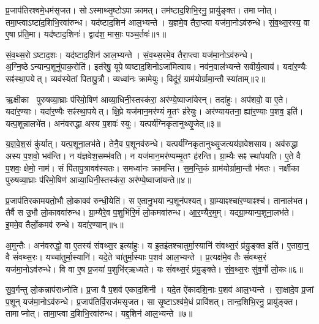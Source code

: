 प्र॒जाप॑तिरश्वमे॒धम॑सृजत।
सोऽस्माथ्सृ॒ष्टो\-ऽपाक्रामत्।
तम॑ष्टाद॒शिभि॒रनु॒ प्रायु॑ङ्क्त।
तमाप्नोत्।
तमा॒प्त्वा\-ऽष्टा॑द॒शिभि॒रवा॑रुन्ध।
यद॑ष्टाद॒शिन॑ आल॒भ्यन्ते।
य॒ज्ञमे॒व तैरा॒प्त्वा यज॑मा॒नो\-ऽव॑रुन्धे।
सं॒व॒थ्स॒रस्य॒ वा ए॒षा प्र॑ति॒मा।
यद॑ष्टाद॒शिनः॑।
द्वाद॑श॒ मासाः॒ पञ्च॒र्तवः॑॥१॥

सं॒व॒थ्स॒रो\-ऽष्टाद॒शः।
यद॑ष्टाद॒शिन॑ आल॒भ्यन्ते।
सं॒व॒थ्स॒रमे॒व तैरा॒प्त्वा यज॑मा॒नो\-ऽव॑रुन्धे।
अ॒ग्नि॒ष्ठे\-ऽन्यान्प॒शूनु॑पाक॒रोति॑।
इत॑रेषु॒ यूपेष्वष्टाद॒शिनो\-ऽजा॑मित्वाय।
नव॑न॒वाल॑भ्यन्ते सवीर्य॒त्वाय॑।
यदा॑र॒ण्यैः सꣴ॑स्था॒पयेत्।
व्यव॑स्येतां पितापु॒त्रौ।
व्यध्वा॑नः क्रामेयुः।
विदू॑रं॒ ग्राम॑योर्ग्रामा॒न्तौ स्या॑ताम्॥२॥

ऋ॒क्षीका पुरुषव्या॒घ्राः प॑रिमो॒षिण॑ आव्या॒धिनी॒स्तस्क॑रा॒ अर॑ण्ये॒ष्वाजा॑येरन्।
तदा॑हुः।
अप॑शवो॒ वा ए॒ते।
यदा॑र॒ण्याः।
यदा॑र॒ण्यैः सꣴ॑स्था॒पयेत्।
क्षि॒प्रे यज॑मान॒मर॑ण्यं मृ॒तꣳ ह॑रेयुः।
अर॑ण्यायतना॒ ह्या॑र॒ण्याः प॒शव॒ इति॑।
यत्प॒शून्नालभे॑त।
अन॑वरुद्धा अस्य प॒शवः॑ स्युः।
यत्पर्य॑ग्निकृतानुथ्सृ॒जेत्॥३॥

य॒ज्ञ॒वे॒श॒सं कु॑र्यात्।
यत्प॒शूना॒लभ॑ते।
तेनै॒व प॒शूनव॑रुन्धे।
यत्पर्य॑ग्निकृतानुथ्सृ॒जत्यय॑ज्ञवेशसाय।
अव॑रुद्धा अस्य प॒शवो॒ भव॑न्ति।
न य॑ज्ञवेश॒सम्भ॑वति।
न यज॑मान॒मर॑ण्यम्मृ॒तꣳ ह॑रन्ति।
ग्रा॒म्यैः सꣴ स्था॑पयति।
ए॒ते वै प॒शवः॒ क्षेमो॒ नाम॑।
सं पि॑तापु॒त्रावव॑स्यतः।
समध्वा॑नः क्रामन्ति।
स॒म॒न्ति॒कं ग्राम॑योर्ग्रामा॒न्तौ भ॑वतः।
नर्क्षीका पुरुषव्या॒घ्राः प॑रिमो॒षिण॑ आव्या॒धिनी॒स्तस्क॑रा॒ अर॑ण्ये॒ष्वाजा॑यन्ते॥४॥\anuvakamend[ऋ॒तवः॑ स्यातामुथ्सृ॒जेथ्स्य॑त॒स्त्रीणि॑ च]

प्र॒जाप॑तिरकामयतो॒भौ लो॒कावव॑ रुन्धी॒येति॑।
स ए॒तानु॒भयान्प॒शून॑पश्यत्।
ग्रा॒म्याꣴश्चा॑र॒ण्याꣴश्च॑।
तानाल॑भत।
तैर्वै स उ॒भौ लो॒काववा॑रुन्ध।
ग्रा॒म्यैरे॒व प॒शुभि॑रि॒मं लो॒कमवा॑रुन्ध।
आ॒र॒ण्यैर॒मुम्।
यद्ग्रा॒म्यान्प॒शूना॒लभ॑ते।
इ॒ममे॒व तैर्लो॒कमव॑ रुन्धे।
यदा॑र॒ण्यान्॥५॥

अ॒मुन्तैः।
अन॑वरुद्धो॒ वा ए॒तस्य॑ संवथ्स॒र इत्या॑हुः।
य इ॒तइ॑तश्चातुर्मा॒स्यानि॑ संवथ्स॒रं प्र॑यु॒ङ्क्त इति॑।
ए॒तावा॒न्॒ वै सं॑वथ्स॒रः।
यच्चा॑तुर्मा॒स्यानि॑।
यदे॒ते चा॑तुर्मा॒स्याः प॒शव॑ आल॒भ्यन्ते।
प्र॒त्यक्ष॑मे॒व तैः सं॑वथ्स॒रं यज॑मा॒नो\-ऽव॑रुन्धे।
वि वा ए॒ष प्र॒जया॑ प॒शुभि॑र्‌\mbox{}ऋध्यते।
यः सं॑वथ्स॒रं प्र॑यु॒ङ्क्ते।
सं॒व॒थ्स॒रः सु॑व॒र्गो लो॒कः॥६॥

सु॒व॒र्गन्तु लो॒कन्नाप॑राध्नोति।
प्र॒जा वै प॒शव॑ एकाद॒शिनी।
यदे॒त ऐ॑कादशि॒नाः प॒शव॑ आल॒भ्यन्ते।
सा॒क्षादे॒व प्र॒जां प॒शून् यज॑मा॒नो\-ऽव॑रुन्धे।
प्र॒जाप॑तिर्वि॒राज॑मसृजत।
सा सृ॒ष्टा\-ऽश्व॑मे॒धं प्रावि॑शत्।
तान्द॒शिभि॒रनु॒ प्रायु॑ङ्क्त।
तामाप्नोत्।
तामा॒प्त्वा द॒शिभि॒रवा॑रुन्ध।
यद्द॒शिन॑ आल॒भ्यन्ते॥७॥

